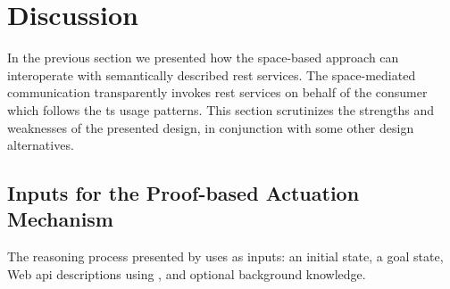 \section{Discussion}
\label{sec:actuation_discussion}


In the previous section we presented how the space-based approach can interoperate with semantically described \ac{rest} services.
The space-mediated communication transparently invokes \ac{rest} services on behalf of the consumer which follows the \ac{ts} usage patterns.
This section scrutinizes the strengths and weaknesses of the presented design, in conjunction with some other design alternatives. %












\subsection{Inputs for the Proof-based Actuation Mechanism}
\label{sec:inputs_proof}

The reasoning process presented by \citet{verborgh_ijcs_2014} uses as inputs: %
an initial state,
a goal state,
Web \ac{api} descriptions using \restdesc{}, and
optional background knowledge.


